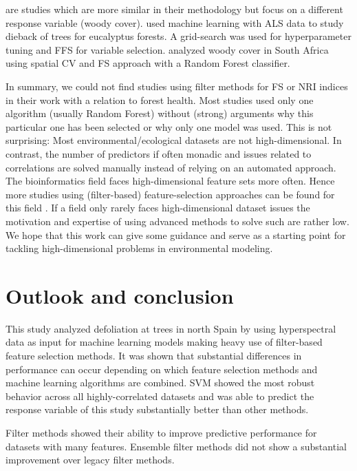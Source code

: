 \documentclass[letterpaper, peerreview]{IEEEtran}
\begin{document}
\cite{shendryk2016, ludwig2019} are studies which are more similar in their methodology but focus on a different response variable (woody cover).
\cite{shendryk2016} used machine learning with \ac{ALS} data to study dieback of trees for eucalyptus forests.
A grid-search was used for hyperparameter tuning and \ac{FFS} for variable selection.
\cite{ludwig2019} analyzed woody cover in South Africa using spatial \ac{CV} and \ac{FS} approach \cite{meyer2018} with a Random Forest classifier.

In summary, we could not find studies using filter methods for \ac{FS} or \ac{NRI} indices in their work with a relation to forest health.
Most studies used only one algorithm (usually Random Forest) without (strong) arguments why this particular one has been selected or why only one model was used.
This is not surprising: Most environmental/ecological datasets are not high-dimensional.
In contrast, the number of predictors if often monadic and issues related to correlations are solved manually instead of relying on an automated approach.
The bioinformatics field faces high-dimensional feature sets more often.
Hence more studies using (filter-based) feature-selection approaches can be found for this field \cite{guo2019, radovic2017}.
If a field only rarely faces high-dimensional dataset issues the motivation and expertise of using advanced methods to solve such are rather low.
We hope that this work can give some guidance and serve as a starting point for tackling high-dimensional problems in environmental modeling.

\section{Outlook and conclusion}
This study analyzed defoliation at trees in north Spain by using hyperspectral data as input for machine learning models making heavy use of filter-based feature selection methods.
It was shown that substantial differences in performance can occur depending on which feature selection methods and machine learning algorithms are combined.
SVM showed the most robust behavior across all highly-correlated datasets and was able to predict the response variable of this study substantially better than other methods.

Filter methods showed their ability to improve predictive performance for datasets with many features.
Ensemble filter methods did not show a substantial improvement over legacy filter methods.
\end{document}

